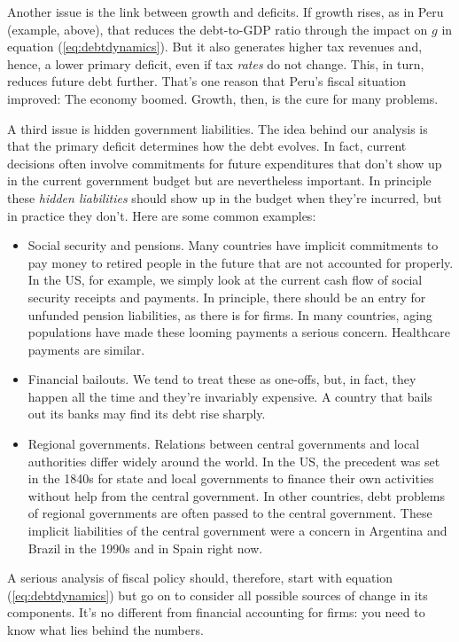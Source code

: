 Another issue is the link between growth and deficits.
If growth rises, as in Peru (example, above),
that reduces the debt-to-GDP ratio through
the impact on $g$ in equation (\ref{eq:debtdynamics}).
But it also generates higher tax revenues and, hence,
a lower primary deficit, even if tax {\it rates\/}
do not change.
This, in turn, reduces future debt further.
That's one reason that Peru's fiscal situation improved:
The economy boomed.
Growth, then, is the cure for many problems.

A third issue is hidden government liabilities.
The idea behind our analysis
is that the primary deficit determines how the debt evolves.
In fact, current decisions often involve commitments
for future expenditures that don't show up in the
current government budget but are nevertheless important.
In principle these {\it hidden liabilities\/}
should show up in the budget when they're incurred,
but in practice they don't.
Here are some common examples:
%
\begin{itemize}
\item Social security and pensions.
Many countries have implicit commitments to pay
money to retired people in the future
that are not accounted for properly.
In the US, for example, we simply look at the current cash flow of
social security receipts and payments.
In principle, there should be an entry for unfunded pension
liabilities,
as there is for firms.
In many countries, aging populations have made these looming payments
a serious concern.
Healthcare payments are similar.

\item Financial bailouts.
We tend to treat these as one-offs, but, in fact, they happen all the time and they're invariably expensive.
A country that bails out its banks may find its debt rise sharply.

\item Regional governments.
Relations between central governments and local authorities
differ widely around the world.
In the US, the precedent was set in the 1840s for state and local
governments to finance their own activities without help from
the central government.
In other countries, debt problems of regional governments are often
passed to the central government.
These implicit liabilities of the central government were a concern in
Argentina and Brazil in the 1990s and in Spain right now.
\end{itemize}

A serious analysis of fiscal policy should, therefore,
start with equation (\ref{eq:debtdynamics})
but go on to consider all possible sources of change in its components.
It's no different from financial accounting for firms:
you need to know what lies behind the numbers.


